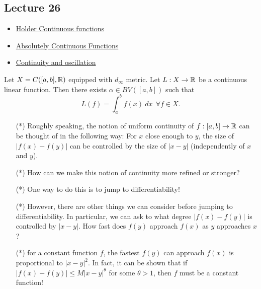 \subsection{Lecture 26}

\begin{itemize}
    \item {\hyperref[Holder Continuous functions]{Holder Continuous functions}} 
    \item {\hyperref[Absolutely Continuous Functions]{Absolutely Continuous Functions}}  
    \item {\hyperref[Continuity and oscillation]{Continuity and oscillation}} 
\end{itemize}

\begin{theorem}
    Let \( X = C([a,b], \mathbb{R} ) \) equipped with \( {d}_{\infty } \) metric. Let \( L : X \to \mathbb{R}  \) be a continuous linear function. Then there exists \( \alpha \in BV ([a,b]) \) such that 
    \[  L(f) = \int_{ a }^{ b } f(x) \ dx \ \ \forall f \in X. \]
\end{theorem}

\begin{remark}
    \begin{enumerate}
        \item[(*)] Roughly speaking, the notion of uniform continuity of \( f:[a,b] \to \mathbb{R}  \) can be thought of in the following way: For \( x  \) close enough to \( y \), the size of \( | f(x) - f(y) |  \) can be controlled by the size of \( | x - y  |  \) (independently of \( x  \) and \( y \)).
        \item[(*)] How can we make this notion of continuity more refined or stronger?
        \item[(*)] One way to do this is to jump to differentiability!
    \end{enumerate}
\end{remark}

\begin{remark}
   \begin{enumerate}
       \item[(*)] However, there are other things we can consider before jumping to differentiability. In particular, we can ask to what degree \( | f(x) - f(y) |  \) is controlled by \( | x - y  | \). How fast does \( f(y) \) approach \( f(x) \) as \( y  \) approaches \( x  \)?
        \item[(*)] for a constant function \( f  \), the fastest \( f(y) \) can approach \( f(x) \) is proportional to \( | x - y  |^{2} \). In fact, it can be shown that if \( | f(x) - f(y) |  \leq M |  x - y  |^{\theta} \) for some \( \theta > 1  \), then \( f  \) must be a constant function!
   \end{enumerate} 
\end{remark}

